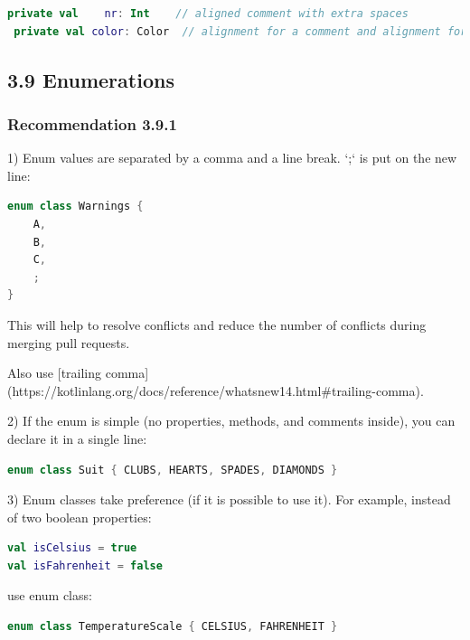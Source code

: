 {{{{\begin{lstlisting}[language=Kotlin]
 private val    nr: Int    // aligned comment with extra spaces
 private val color: Color  // alignment for a comment and alignment for identifier name
\end{lstlisting}


\subsection*{\textbf{3.9 Enumerations}}

\subsubsection*{\textbf{Recommendation 3.9.1}}
\leavevmode\newline

1) Enum values are separated by a comma and a line break. `;` is put on the new line:

\begin{lstlisting}[language=Kotlin]
enum class Warnings {
    A,
    B,
    C,
    ;
}
\end{lstlisting}


This will help to resolve conflicts and reduce the number of conflicts during merging pull requests.

Also use [trailing comma](https://kotlinlang.org/docs/reference/whatsnew14.html\#trailing-comma).



2) If the enum is simple (no properties, methods, and comments inside), you can declare it in a single line:

\begin{lstlisting}[language=Kotlin]
enum class Suit { CLUBS, HEARTS, SPADES, DIAMONDS }
\end{lstlisting}


3) Enum classes take preference (if it is possible to use it). For example, instead of two boolean properties:



\begin{lstlisting}[language=Kotlin]
val isCelsius = true
val isFahrenheit = false
\end{lstlisting}


use enum class:



\begin{lstlisting}[language=Kotlin]
enum class TemperatureScale { CELSIUS, FAHRENHEIT }
\end{lstlisting}


}}}}
